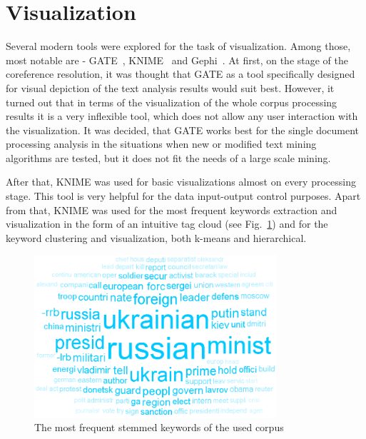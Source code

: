 \documentclass[]{article}
\begin{document}
\section{Visualization}
%
Several modern tools were explored for the task of visualization. Among those, most notable are - GATE~\cite{gate}, KNIME~\cite{knime} and Gephi~\cite{gephi}. At first, on the stage of the coreference resolution, it was thought that GATE as a tool specifically designed for visual depiction of the text analysis results would suit best. However, it turned out that in terms of the visualization of the whole corpus processing results it is a very inflexible tool, which does not allow any user interaction with the visualization. It was decided, that GATE works best for the single document processing analysis in the situations when new or modified text mining algorithms are tested, but it does not fit the needs of a large scale mining.

After that, KNIME was used for basic visualizations almost on every processing stage. This tool is very helpful for the data input-output control purposes. Apart from that, KNIME was used for the most frequent keywords extraction and visualization in the form of an intuitive tag cloud (see Fig.~\ref{Cloud}) and for the keyword clustering and visualization, both k-means and hierarchical.
\begin{figure}[htbp]
  \centering
    \includegraphics[width=0.8\textwidth]{images/Cloud}
    \caption{The most frequent stemmed keywords of the used corpus}
  \label{Cloud}
\end{figure}
\end{document}
